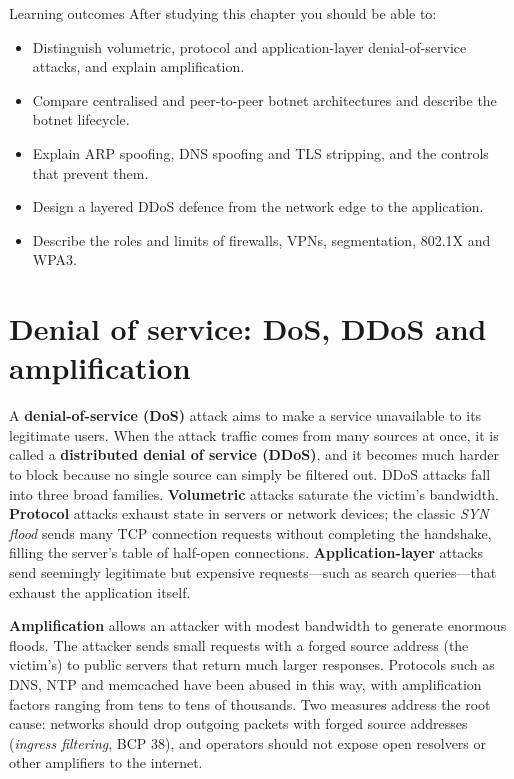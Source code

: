 \documentclass[11pt,openany]{book}
\begin{document}
\begin{outcomesbox}{Learning outcomes}
After studying this chapter you should be able to:
\begin{itemize}
  \item Distinguish volumetric, protocol and application-layer denial-of-service attacks, and explain amplification.
  \item Compare centralised and peer-to-peer botnet architectures and describe the botnet lifecycle.
  \item Explain ARP spoofing, DNS spoofing and TLS stripping, and the controls that prevent them.
  \item Design a layered DDoS defence from the network edge to the application.
  \item Describe the roles and limits of firewalls, VPNs, segmentation, 802.1X and WPA3.
\end{itemize}
\end{outcomesbox}

\section{Denial of service: DoS, DDoS and amplification}\label{sec:6.1}
A \textbf{denial-of-service (DoS)} attack aims to make a service unavailable to its legitimate users. When the attack traffic comes from many sources at once, it is called a \textbf{distributed denial of service (DDoS)}, and it becomes much harder to block because no single source can simply be filtered out. DDoS attacks fall into three broad families. \textbf{Volumetric} attacks saturate the victim's bandwidth. \textbf{Protocol} attacks exhaust state in servers or network devices; the classic \emph{SYN flood} sends many TCP connection requests without completing the handshake, filling the server's table of half-open connections. \textbf{Application-layer} attacks send seemingly legitimate but expensive requests—such as search queries—that exhaust the application itself.

\textbf{Amplification} allows an attacker with modest bandwidth to generate enormous floods. The attacker sends small requests with a forged source address (the victim's) to public servers that return much larger responses. Protocols such as DNS, NTP and memcached have been abused in this way, with amplification factors ranging from tens to tens of thousands. Two measures address the root cause: networks should drop outgoing packets with forged source addresses (\emph{ingress filtering}, BCP 38), and operators should not expose open resolvers or other amplifiers to the internet.
\end{document}
